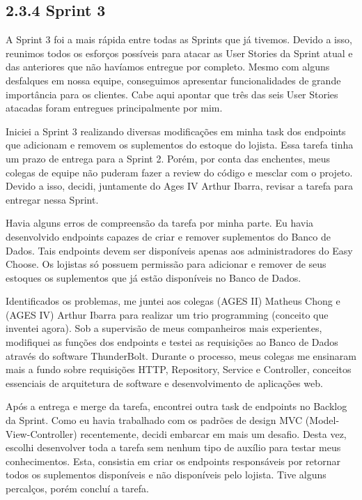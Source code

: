\hypertarget{__RefHeading___Toc4749_3118176633}{}
\subsection*{2.3.4 Sprint 3}
\label{unit:ages-i-sprint-3}

\indent \originaltab{}A Sprint 3 foi a mais rápida entre todas as Sprints que já tivemos. Devido a isso, reunimos todos os esforços possíveis para atacar as User Stories da Sprint atual e das anteriores que não havíamos entregue por completo. Mesmo com alguns desfalques em nossa equipe, conseguimos apresentar funcionalidades de grande importância para os clientes. Cabe aqui apontar que três das seis User Stories atacadas foram entregues principalmente por mim.

\indent \originaltab{}Iniciei a Sprint 3 realizando diversas modificações em minha task dos endpoints que adicionam e removem os suplementos do estoque do lojista. Essa tarefa tinha um prazo de entrega para a Sprint 2. Porém, por conta das enchentes, meus colegas de equipe não puderam fazer a review do código e mesclar com o projeto. Devido a isso, decidi, juntamente do Ages IV Arthur Ibarra, revisar a tarefa para entregar nessa Sprint.\originalspace{}

\indent \originaltab{}Havia alguns erros de compreensão da tarefa por minha parte. Eu havia desenvolvido endpoints capazes de criar e remover suplementos do Banco de Dados. Tais endpoints devem ser disponíveis apenas aos administradores do Easy Choose. Os lojistas só possuem permissão para adicionar e remover de seus estoques os suplementos que já estão disponíveis no Banco de Dados.\originalspace{}

\indent \originaltab{}Identificados os problemas, me juntei aos colegas (AGES II) Matheus Chong e (AGES IV) Arthur Ibarra para realizar um trio programming (conceito que inventei agora). Sob a supervisão de meus companheiros mais experientes, modifiquei as funções dos endpoints e testei as requisições ao Banco de Dados através do software ThunderBolt. Durante o processo, meus colegas me ensinaram mais a fundo sobre requisições HTTP, Repository, Service e Controller, conceitos essenciais de arquitetura de software e desenvolvimento de aplicações web.\originalspace{}

\indent \originaltab{}Após a entrega e merge da tarefa, encontrei outra task de endpoints no Backlog da Sprint. Como eu havia trabalhado com os padrões de design MVC (Model-View-Controller) recentemente, decidi embarcar em mais um desafio. Desta vez, escolhi desenvolver toda a tarefa sem nenhum tipo de auxílio para testar meus conhecimentos. Esta, consistia em criar os endpoints responsáveis por retornar todos os suplementos disponíveis e não disponíveis pelo lojista. Tive alguns percalços, porém concluí a tarefa.

